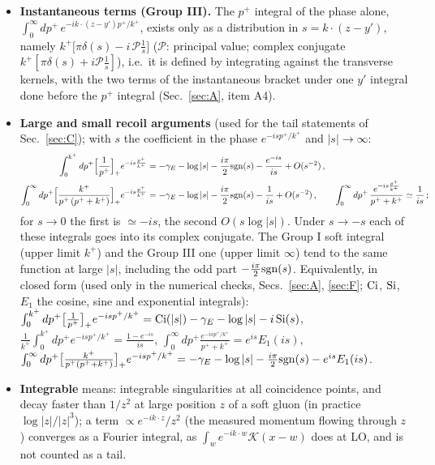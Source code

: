 \documentclass[9pt]{article}
\numberwithin{equation}{section}
\begin{document}
\begin{itemize}
\item \textbf{Instantaneous terms (Group III).} The $p^{+}$ integral of the phase alone, $\int_{0}^{\infty}dp^{+}\,e^{-ik\cdot(z-y')p^{+}/k^{+}}$, exists only as a distribution in $s=k\cdot(z-y')$, namely $k^{+}\big[\pi\delta(s)-i\,\mathcal{P}\frac{1}{s}\big]$ ($\mathcal{P}$: principal value; complex conjugate $k^{+}[\pi\delta(s)+i\mathcal{P}\frac{1}{s}]$), i.e.\ it is defined by integrating against the transverse kernels, with the two terms of the instantaneous bracket under one $y'$ integral done before the $p^{+}$ integral (Sec.~\ref{sec:A}, item A4).
\item \textbf{Large and small recoil arguments} (used for the tail statements of Sec.~\ref{sec:C}); with $s$ the coefficient in the phase $e^{-isp^{+}/k^{+}}$ and $|s|\to\infty$:
\begin{align}\label{eq:asym}
\int_{0}^{k^{+}}dp^{+}\Big[\frac{1}{p^{+}}\Big]_{+}e^{-is\frac{p^{+}}{k^{+}}}&=-\gamma_{E}-\log|s|-\frac{i\pi}{2}{\rm sgn}(s)-\frac{e^{-is}}{is}+O(s^{-2})\,,\notag\\
\int_{0}^{\infty}dp^{+}\Big[\frac{k^{+}}{p^{+}\,(p^{+}+k^{+})}\Big]_{+}e^{-is\frac{p^{+}}{k^{+}}}&=-\gamma_{E}-\log|s|-\frac{i\pi}{2}{\rm sgn}(s)-\frac{1}{is}+O(s^{-2})\,,\qquad\int_{0}^{\infty}dp^{+}\,\frac{e^{-is\frac{p^{+}}{k^{+}}}}{p^{+}+k^{+}}\simeq\frac{1}{is}\,;
\end{align}
for $s\to0$ the first is $\simeq-is$, the second $O(s\log|s|)$. Under $s\to-s$ each of these integrals goes into its complex conjugate. The Group I soft integral (upper limit $k^{+}$) and the Group III one (upper limit $\infty$) tend to the same function at large $|s|$, including the odd part $-\frac{i\pi}{2}{\rm sgn}(s)$. Equivalently, in closed form (used only in the numerical checks, Secs.~\ref{sec:A}, \ref{sec:F}; ${\rm Ci}$, ${\rm Si}$, $E_{1}$ the cosine, sine and exponential integrals): $\int_{0}^{k^{+}}dp^{+}\big[\frac{1}{p^{+}}\big]_{+}e^{-isp^{+}/k^{+}}={\rm Ci}(|s|)-\gamma_{E}-\log|s|-i\,{\rm Si}(s)$, $\frac{1}{k^{+}}\int_{0}^{k^{+}}dp^{+}e^{-isp^{+}/k^{+}}=\frac{1-e^{-is}}{is}$, $\int_{0}^{\infty}dp^{+}\frac{e^{-isp^{+}/k^{+}}}{p^{+}+k^{+}}=e^{is}E_{1}(is)$, $\int_{0}^{\infty}dp^{+}\big[\frac{k^{+}}{p^{+}(p^{+}+k^{+})}\big]_{+}e^{-isp^{+}/k^{+}}=-\gamma_{E}-\log|s|-\frac{i\pi}{2}{\rm sgn}(s)-e^{is}E_{1}(is)$.
\item \textbf{Integrable} means: integrable singularities at all coincidence points, and decay faster than $1/z^{2}$ at large position $z$ of a soft gluon (in practice $\log|z|/|z|^{3}$); a term $\propto e^{-ik\cdot z}/z^{2}$ (the measured momentum flowing through $z$) converges as a Fourier integral, as $\int_{w}e^{-ik\cdot w}\mathcal{K}(x-w)$ does at LO, and is not counted as a tail.
\end{itemize}
\end{document}
